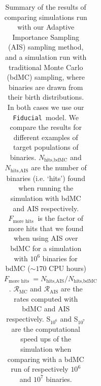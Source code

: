 \documentclass[a4paper,fleqn,usenatbib]{mnras}
\newcommand\Fiducial{\texttt{Fiducial }}
\newcommand\rate{\mathcal{R}}
\begin{document}
\begin{table}
\begin{tabular}{|l|l|l|l|l|l|l|l|l|}
\end{tabular}
\caption{Summary of the results of comparing simulations run with our Adaptive Importance Sampling (AIS) sampling method, and a simulation run with traditional Monte Carlo (bdMC) sampling, where binaries are drawn from their birth distributions. In both cases we use our \Fiducial model.  We compare the results for different examples of target populations of binaries.  $N_{\text{hits,bdMC}}$ and $N_{\text{hits,AIS}}$ are the number of binaries (i.e. `hits') found  when running the simulation with bdMC and AIS respectively. $ F_{\text{more hits }}$ is the factor of more hits that we found when using AIS over bdMC for a simulation with $10^6$ binaries for bdMC  ($\sim 170$ CPU hours)  $ F_{\text{more hits }} = N_{\text{hits,AIS}}/ N_{\text{hits,bdMC}}$. $\rate_{\text{MC}}$  and $\rate_{\text{AIS}}$ are the rates computed with bdMC and AIS respectively. S$_{10^6}$ and S$_{10^7}$ are the computational speed ups of the simulation when comparing with a bdMC run of respectively $10^6$ and $10^7$ binaries. }
\end{table}
\end{document}
